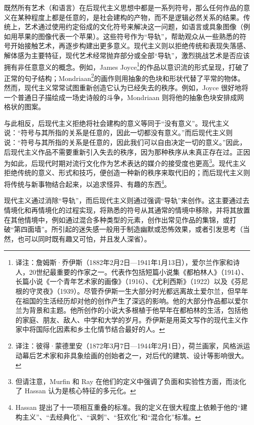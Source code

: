 既然所有艺术（和语言）在后现代主义思想中都是一系列符号，那么任何作品的意义在某种程度上都是任意的，是社会建构的产物，而不是逻辑必然关系的结果。传统上，艺术通过使用约定俗成的文化符号来解决这一问题，如语言或具象图像（例如用苹果的图像代表一个苹果）。这些符号作为“导轨”，帮助观众从一些熟悉的符号开始接触艺术，再逐步构建出更多意义。现代主义则以拒绝传统和表现失落感、解体感为主要特征，现代艺术经常抛弃部分或全部“导轨”，激烈挑战艺术是否应该拥有非任意意义的概念。例如，James Joyce\footnote{译注：詹姆斯·乔伊斯（1882年2月2日—1941年1月13日），爱尔兰作家和诗人，20世纪最重要的作家之一。代表作包括短篇小说集《都柏林人》（1914）、长篇小说《一个青年艺术家的画像》（1916）、《尤利西斯》（1922）以及《芬尼根的守灵夜》（1939）。尽管乔伊斯一生大部分时光都远离故土爱尔兰，但早年在祖国的生活经历却对他的创作产生了深远的影响。他的大部分作品都以爱尔兰为背景和主题。他所创作的小说大多根植于他早年在都柏林的生活，包括他的家庭、朋友、敌人、中学和大学的岁月。乔伊斯是用英文写作的现代主义作家中将国际化因素和乡土化情节结合最好的人。}的作品以意识流的形式呈现，打破了正常的句子结构；Mondriaan\footnote{译注：彼得·蒙德里安（1872年3月7日—1944年2月1日），荷兰画家，风格派运动幕后艺术家和非具象绘画的创始者之一，对后代的建筑、设计等影响很大。}的画作则用抽象的色块和形状代替了平常的物体。然而，现代主义常常试图重新创造它认为已经失去的秩序\cite{ref3}。例如，Joyce 很好地将一个普通日子描绘成一场史诗般的斗争，Mondriaan 则将他的抽象色块安排成网格状的图案。

与此相反，后现代主义拒绝将社会建构的意义等同于“没有意义”。现代主义说：“符号与其所指的关系是任意的，因此一切都没有意义。”而后现代主义则说：“符号与其所指的关系是任意的，因此我们可以自由决定一切的意义。”因此，后现代主义作品不需要重新引入失去的秩序，因为那种秩序从未真正存在过。正因为如此，后现代时期对流行文化作为艺术表达的媒介的接受度也更高\footnote{但请注意，Murfin 和 Ray 在他们的定义中强调了负面和实验性方面，而淡化了 Hassan 认为是核心特征的多元化。}\cite{ref4}。现代主义拒绝传统的意义、形式和技巧，便创造一种新的秩序来取代旧的；而后现代主义则将传统与新事物结合起来，以追求怪异、有趣的东西\footnote{Hassan 提出了十一项相互重叠的标准。我的定义在很大程度上依赖于他的“建构主义”、“去经典化”、“讽刺”、“狂欢化”和“混合化”标准。}。\cite{ref5}

现代主义通过消除“导轨”，而后现代主义则通过强调“导轨”来创作。这主要通过去情境化和再情境化的过程实现，将熟悉的符号从其通常的情境中移除，并将其放置在其他情境中，例如通过混合多种类型的元素，创作出常见作品的集锦，或打破“第四面墙”\cite{ref5}。所引起的迷失感一般用于制造幽默或恐怖效果，或者引发思考（当然，也可以同时既有趣又可怕，并且发人深省）。

